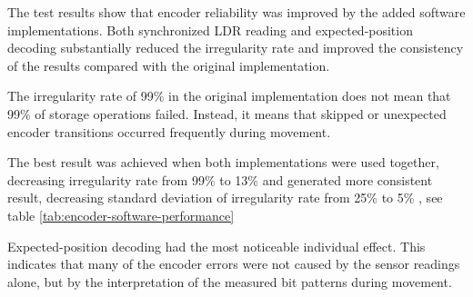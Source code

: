 
The test results show that encoder reliability was improved by the added software implementations. Both synchronized LDR reading and expected-position decoding substantially reduced the irregularity rate and improved the consistency of the results compared with the original implementation.

The irregularity rate of 99\% in the original implementation does not mean that 99\% of storage operations failed. Instead, it means that skipped or unexpected encoder transitions occurred frequently during movement.

The best result was achieved when both implementations were used together, decreasing irregularity rate from 99\% to 13\% and generated more consistent result, decreasing standard deviation of irregularity rate from 25\% to 5\% , see table \ref{tab:encoder-software-performance}

Expected-position decoding had the most noticeable individual effect. This indicates that many of the encoder errors were not caused by the sensor readings alone, but by the interpretation of the measured bit patterns during movement.




